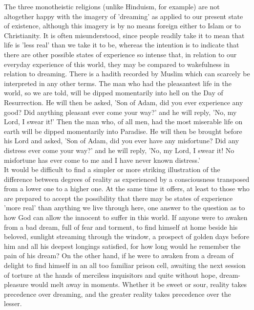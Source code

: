 \documentclass[10pt, twoside,openright]{book}
\begin{document}
The three monotheistic religions (unlike Hinduism, for example) are not altogether happy with the 
imagery of 'dreaming' as applied to our present state of existence, although this imagery is by no 
means foreign either to Islam or to Christianity. It is often misunderstood, since people readily take 
it to mean that life is 'less real' than we take it to be, whereas the intention is to indicate that 
there are other possible states of experience so intense that, in relation to our everyday experience 
of this world, they may be compared to wakefulness in relation to dreaming. There is a hadith 
recorded by Muslim which can scarcely be interpreted in any other terms. The man who had the 
pleasantest life in the world, so we are told, will be dipped momentarily into hell on the Day of 
Resurrection. He will then be asked, 'Son of Adam, did you ever experience any good? Did anything 
pleasant ever come your way?' and he will reply, 'No, my Lord, I swear it!' Then the man who, of all 
men, had the most miserable life on earth will be dipped momentarily into Paradise. He will then be 
brought before his Lord and asked, 'Son of Adam, did you ever have any misfortune? Did any distress 
ever come your way?' and he will reply, 'No, my Lord, I swear it! No misfortune has ever come to me 
and I have never known distress.' \\

It would be difficult to find a simpler or more striking illustration of the difference between 
degrees of reality as experienced by a consciousness transposed from a lower one to a higher one. At 
the same time it offers, at least to those who are prepared to accept the possibility that there may 
be states of experience 'more real' than anything we live through here, one answer to the question as 
to how God can allow the innocent to suffer in this world. If anyone were to awaken from a bad dream, 
full of fear and torment, to find himself at home beside his beloved, sunlight streaming through the 
window, a prospect of golden days before him and all his deepest longings satisfied, for how long 
would he remember the pain of his dream? On the other hand, if he were to awaken from a dream of 
delight to find himself in an all too familiar prison cell, awaiting the next session of torture at 
the hands of merciless inquisitors and quite without hope, dream\hyp{}pleasure would melt away in moments. 
Whether it be sweet or sour, reality takes precedence over dreaming, and the greater reality takes 
precedence over the lesser. \\
\end{document}
